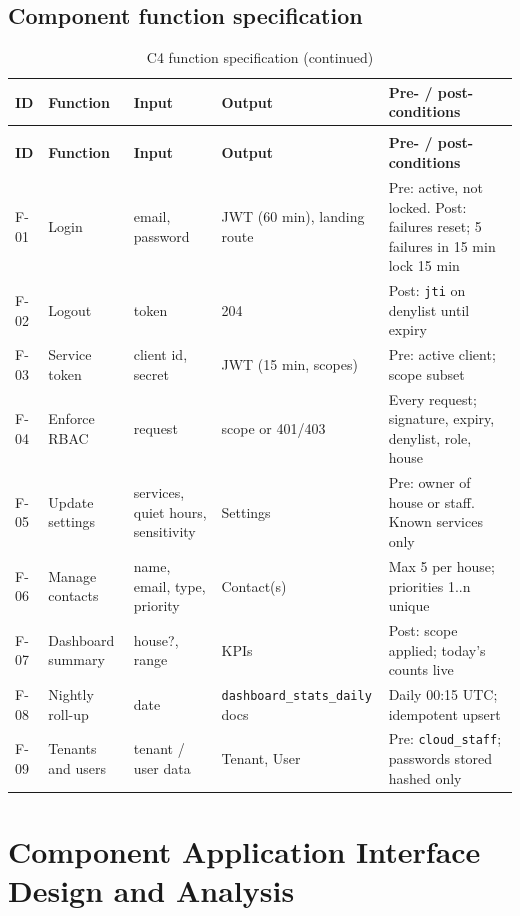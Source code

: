 \subsection{Component function specification}
\begin{longtable}{L{1.1cm}L{2.6cm}L{3.0cm}L{3.0cm}L{5.0cm}}
\caption{C4 function specification}\label{tab:c4-funcspec}\\
\toprule
\textbf{ID} & \textbf{Function} & \textbf{Input} & \textbf{Output} & \textbf{Pre- / post-conditions} \\
\midrule
\endfirsthead
\caption[]{C4 function specification (continued)}\\
\toprule
\textbf{ID} & \textbf{Function} & \textbf{Input} & \textbf{Output} & \textbf{Pre- / post-conditions} \\
\midrule
\endhead
F-01 & Login & email, password & JWT (60 min), landing route & Pre: active, not locked. Post: failures reset; 5 failures in 15 min lock 15 min \\
F-02 & Logout & token & 204 & Post: \texttt{jti} on denylist until expiry \\
F-03 & Service token & client id, secret & JWT (15 min, scopes) & Pre: active client; scope subset \\
F-04 & Enforce RBAC & request & scope or 401/403 & Every request; signature, expiry, denylist, role, house \\
F-05 & Update settings & services, quiet hours, sensitivity & Settings & Pre: owner of house or staff. Known services only \\
F-06 & Manage contacts & name, email, type, priority & Contact(s) & Max 5 per house; priorities 1..n unique \\
F-07 & Dashboard summary & house?, range & KPIs & Post: scope applied; today's counts live \\
F-08 & Nightly roll-up & date & \texttt{dashboard\_stats\_daily} docs & Daily 00:15 UTC; idempotent upsert \\
F-09 & Tenants and users & tenant / user data & Tenant, User & Pre: \texttt{cloud\_staff}; passwords stored hashed only \\
\bottomrule
\end{longtable}

\section{Component Application Interface Design and Analysis}

